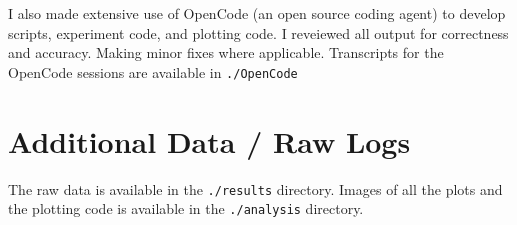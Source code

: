 \documentclass[11pt]{article}
\begin{document}
I also made extensive use of OpenCode (an open source coding agent) to develop scripts, experiment code, and plotting
code. I reveiewed all output for correctness and accuracy. Making minor fixes where applicable. Transcripts for the
OpenCode sessions are available in \texttt{./OpenCode}

\section{Additional Data / Raw Logs}
The raw data is available in the \texttt{./results} directory. Images of all the plots and the plotting code is
available in the \texttt{./analysis} directory.
\end{document}
